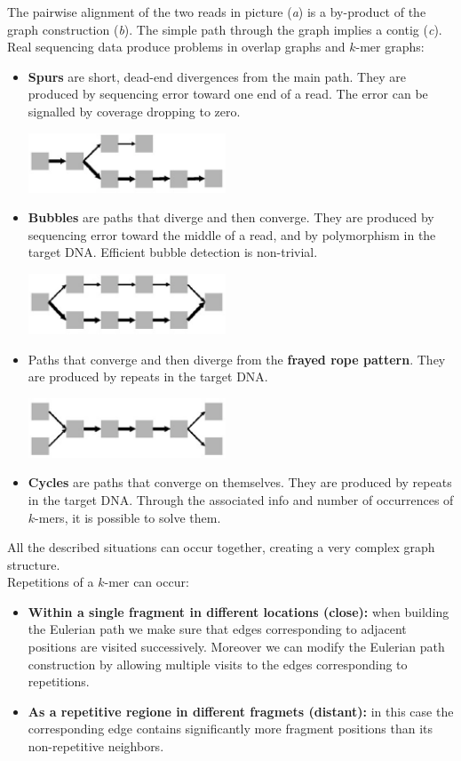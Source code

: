 The pairwise alignment of the two reads in picture (\textit{a}) is a by-product of the graph construction (\textit{b}). The simple path through the graph implies a contig (\textit{c}).\\
Real sequencing data produce problems in overlap graphs and $k$-mer graphs:
\begin{itemize}
	\item \textbf{Spurs} are short, dead-end divergences from the main path. They are produced by sequencing error toward one end of a read. The error can be signalled by coverage dropping to zero.
	\begin{center}
		\includegraphics[width=0.4\columnwidth]{img/spurs}
	\end{center} 
	\item \textbf{Bubbles} are paths that diverge and then converge. They are produced by sequencing error toward the middle of a read, and by polymorphism in the target DNA. Efficient bubble detection is non-trivial.
	\begin{center}
		\includegraphics[width=0.4\columnwidth]{img/bubbles}
	\end{center} 
	\item Paths that converge and then diverge from the \textbf{frayed rope pattern}. They are produced by repeats in the target DNA.
	\begin{center}
		\includegraphics[width=0.4\columnwidth]{img/fragment}
	\end{center} 
	\item \textbf{Cycles} are paths that converge on themselves. They are produced by repeats in the target DNA. Through the associated info and number of occurrences of $k$-mers, it is possible to solve them.
\end{itemize}
All the described situations can occur together, creating a very complex graph structure.\\
Repetitions of a $k$-mer can occur:
\begin{itemize}
	\item \textbf{Within a single fragment in different locations (close):} when building the Eulerian path we make sure that edges corresponding to adjacent positions are visited successively. Moreover we can modify the Eulerian path construction by allowing multiple visits to the edges corresponding to repetitions.
	\item \textbf{As a repetitive regione in different fragmets (distant):} in this case the corresponding edge contains significantly more fragment positions than its non-repetitive neighbors.
\end{itemize} 
